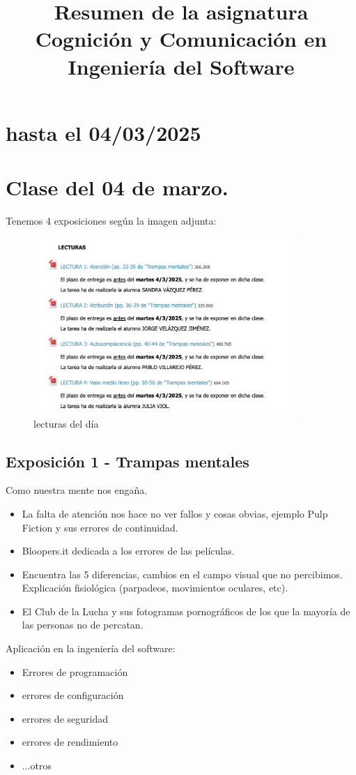 \documentclass[12pt, a4paper, twoside]{article}
\title{Resumen de la asignatura Cognición y Comunicación en Ingeniería del Software}
\begin{document}
\maketitle

\section{hasta el 04/03/2025}


\section{Clase del 04 de marzo.}
Tenemos 4 exposiciones según la imagen adjunta:
\begin{figure}[h]
    \centering
    \includegraphics[width=0.9\textwidth]{./images/0304.jpg}
    \caption{lecturas del día}
\end{figure}

\subsection{Exposición 1 - Trampas mentales}
Como nuestra mente nos engaña. \\
\begin{itemize}
\item{La falta de atención nos hace no ver fallos y cosas obvias, ejemplo Pulp Fiction y sus
errores de continuidad. }
\item{Bloopers.it dedicada a los errores de las películas. }
\item{Encuentra las 5 diferencias, cambios en el campo visual que no percibimos. Explicación 
fisiológica (parpadeos, movimientos oculares, etc). }
\item{El Club de la Lucha y sus fotogramas pornográficos de los que la mayoría de las personas
no de percatan.}
\end{itemize}
Aplicación en la ingeniería del software:
\begin{itemize}
\item{Errores de programación}
\item {errores de configuración}
\item {errores de seguridad}
\item {errores de rendimiento}
\item {...otros}
\end{itemize}
\end{document}

